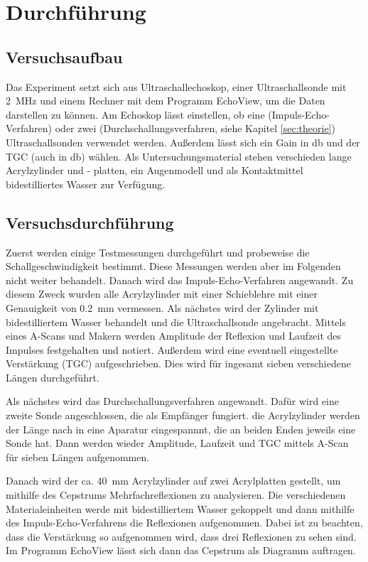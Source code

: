 \section{Durchführung}
\subsection{Versuchsaufbau}
Das Experiment setzt sich aus Ultraschallechoskop, einer Ultraschallsonde mit
\SI{2}{\mega\hertz} und einem Rechner mit dem Programm EchoView, um die Daten darstellen zu können.
Am Echoskop lässt einstellen, ob eine (Impuls-Echo-Verfahren) oder zwei (Durchschallungsverfahren, siehe Kapitel \ref{sec:theorie})
Ultraschallsonden verwendet werden. Außerdem lässt sich ein Gain in \si{\decibel} und
der TGC (auch in \si{\decibel}) wählen. Als Untersuchungsmaterial stehen verschieden lange Acrylzylinder und
- platten, ein Augenmodell und als Kontaktmittel bidestilliertes Wasser zur Verfügung.
\subsection{Versuchsdurchführung}
Zuerst werden einige Testmessungen durchgeführt und probeweise die Schallgeschwindigkeit
bestimmt. Diese Messungen werden aber im Folgenden nicht weiter behandelt. Danach wird
das Impuls-Echo-Verfahren angewandt. Zu diesem Zweck wurden alle Acrylzylinder mit einer
Schieblehre mit einer Genauigkeit von \SI{0.2}{\milli\meter} vermessen. Als nächstes
wird der Zylinder mit bidestilliertem Wasser behandelt und die Ultraschallsonde angebracht.
Mittels eines A-Scans und Makern werden Amplitude der Reflexion und Laufzeit des Impulses
festgehalten und notiert. Außerdem wird eine eventuell eingestellte Verstärkung (TGC) aufgeschrieben.
Dies wird für ingesamt sieben verschiedene Längen durchgeführt.

Als nächstes wird das Durchschallungsverfahren angewandt. Dafür wird eine zweite Sonde
angeschlossen, die als Empfänger fungiert. die Acrylzylinder werden der Länge nach in
eine Aparatur eingespannnt, die an beiden Enden jeweils eine Sonde hat. Dann werden wieder
Amplitude, Laufzeit und TGC mittels A-Scan für sieben Längen aufgenommen.

Danach wird der ca. \SI{40}{\milli\meter} Acrylzylinder auf zwei Acrylplatten gestellt,
um mithilfe des Cepstrums Mehrfachreflexionen zu analysieren. Die verschiedenen Materialeinheiten
werde mit bidestilliertem Wasser gekoppelt und dann mithilfe des Impuls-Echo-Verfahrens die
Reflexionen aufgenommen. Dabei ist zu beachten, dass die Verstärkung so aufgenommen wird,
dass drei Reflexionen zu sehen sind. Im Programm EchoView lässt sich dann das Cepstrum
als Diagramm auftragen.


